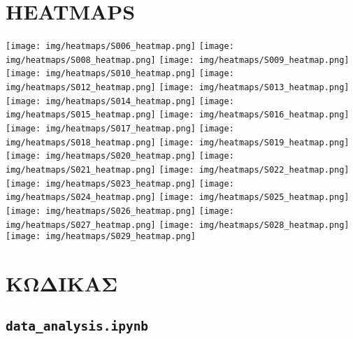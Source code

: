     \section{HEATMAPS}

        \begin{multicols}{2} \centering \noindent
            \texttt{[image: img/heatmaps/S006\_heatmap.png]}
            \texttt{[image: img/heatmaps/S008\_heatmap.png]}
            \texttt{[image: img/heatmaps/S009\_heatmap.png]}
            \texttt{[image: img/heatmaps/S010\_heatmap.png]}
            \texttt{[image: img/heatmaps/S012\_heatmap.png]}
            \texttt{[image: img/heatmaps/S013\_heatmap.png]}
            \texttt{[image: img/heatmaps/S014\_heatmap.png]}
            \texttt{[image: img/heatmaps/S015\_heatmap.png]}
            \texttt{[image: img/heatmaps/S016\_heatmap.png]}
            \texttt{[image: img/heatmaps/S017\_heatmap.png]}
            \texttt{[image: img/heatmaps/S018\_heatmap.png]}
            \texttt{[image: img/heatmaps/S019\_heatmap.png]}
            \texttt{[image: img/heatmaps/S020\_heatmap.png]}
            \texttt{[image: img/heatmaps/S021\_heatmap.png]}
            \texttt{[image: img/heatmaps/S022\_heatmap.png]}
            \texttt{[image: img/heatmaps/S023\_heatmap.png]}
            \texttt{[image: img/heatmaps/S024\_heatmap.png]}
            \texttt{[image: img/heatmaps/S025\_heatmap.png]}
            \texttt{[image: img/heatmaps/S026\_heatmap.png]}
            \texttt{[image: img/heatmaps/S027\_heatmap.png]}
            \texttt{[image: img/heatmaps/S028\_heatmap.png]}
            \texttt{[image: img/heatmaps/S029\_heatmap.png]}
        \end{multicols}

    \section{ΚΩΔΙΚΑΣ}
    \subsection{\texttt{data\_analysis.ipynb}}

